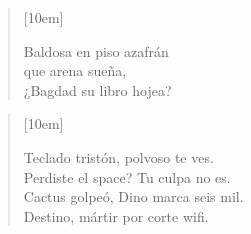\documentclass{article}
\begin{document}
\begin{verse}[10em]
	\begin{altverse}
		Baldosa en piso azafrán\\
		que arena sueña,\\
		¿Bagdad su libro hojea?\\
	\end{altverse}
\end{verse}

\begin{verse}[10em]
	\begin{altverse}
		Teclado tristón, polvoso te ves. \\
		Perdiste el space? Tu culpa no es. \\
    Cactus golpeó, Dino marca seis mil. \\
    Destino, mártir por corte wifi. \\
	\end{altverse}
\end{verse}
\end{document}
